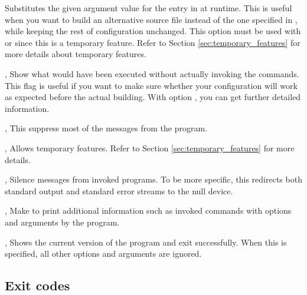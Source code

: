\documentclass{llmk-doc}
\begin{document}
\begin{clopt}{}
Substitutes the given argument value for the  entry in
 at runtime. This is useful when you want to build an
alternative source file instead of the one specified in ,
while keeping the rest of configuration unchanged. This option must be
used with  or  since this is a temporary
feature. Refer to Section \ref{sec:temporary_features} for more details
about temporary features.
\end{clopt}

\begin{clopt}{, }
Show what would have been executed without actually invoking the commands. This
flag is useful if you want to make sure whether your configuration will work as
expected before the actual building. With option , you can get
further detailed information.
\end{clopt}

\begin{clopt}{, }
This suppress most of the messages from the program.
\end{clopt}

\begin{clopt}{, }
Allows temporary features. Refer to Section \ref{sec:temporary_features}
for more details.
\end{clopt}

\begin{clopt}{, }
Silence messages from invoked programs. To be more specific, this redirects
both standard output and standard error streams to the null device.
\end{clopt}

\begin{clopt}{, }
Make  to print additional information such as invoked commands
with options and arguments by the program.
\end{clopt}

\begin{clopt}{, }
Shows the current version of the program and exit successfully. When this is
specified, all other options and arguments are ignored.
\end{clopt}

\subsection{Exit codes}
\end{document}
